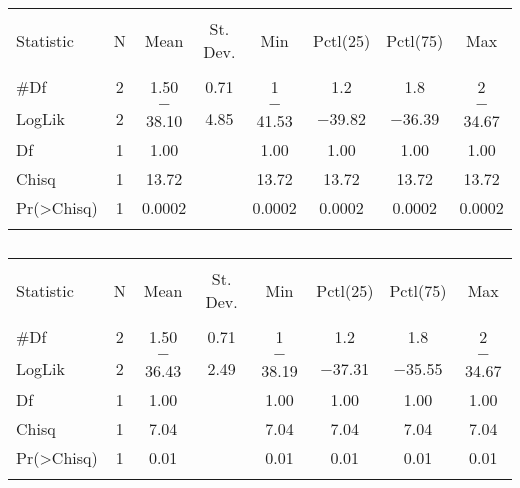 
\begin{table}[!htbp] \centering 
  \caption{} 
  \label{} 
\begin{tabular}{@{\extracolsep{5pt}}lccccccc} 
\\[-1.8ex]\hline 
\hline \\[-1.8ex] 
Statistic & \multicolumn{1}{c}{N} & \multicolumn{1}{c}{Mean} & \multicolumn{1}{c}{St. Dev.} & \multicolumn{1}{c}{Min} & \multicolumn{1}{c}{Pctl(25)} & \multicolumn{1}{c}{Pctl(75)} & \multicolumn{1}{c}{Max} \\ 
\hline \\[-1.8ex] 
\#Df & 2 & 1.50 & 0.71 & 1 & 1.2 & 1.8 & 2 \\ 
LogLik & 2 & $-$38.10 & 4.85 & $-$41.53 & $-$39.82 & $-$36.39 & $-$34.67 \\ 
Df & 1 & 1.00 &  & 1.00 & 1.00 & 1.00 & 1.00 \\ 
Chisq & 1 & 13.72 &  & 13.72 & 13.72 & 13.72 & 13.72 \\ 
Pr(\textgreater Chisq) & 1 & 0.0002 &  & 0.0002 & 0.0002 & 0.0002 & 0.0002 \\ 
\hline \\[-1.8ex] 
\end{tabular} 
\end{table} 

\begin{table}[!htbp] \centering 
  \caption{} 
  \label{} 
\begin{tabular}{@{\extracolsep{5pt}}lccccccc} 
\\[-1.8ex]\hline 
\hline \\[-1.8ex] 
Statistic & \multicolumn{1}{c}{N} & \multicolumn{1}{c}{Mean} & \multicolumn{1}{c}{St. Dev.} & \multicolumn{1}{c}{Min} & \multicolumn{1}{c}{Pctl(25)} & \multicolumn{1}{c}{Pctl(75)} & \multicolumn{1}{c}{Max} \\ 
\hline \\[-1.8ex] 
\#Df & 2 & 1.50 & 0.71 & 1 & 1.2 & 1.8 & 2 \\ 
LogLik & 2 & $-$36.43 & 2.49 & $-$38.19 & $-$37.31 & $-$35.55 & $-$34.67 \\ 
Df & 1 & 1.00 &  & 1.00 & 1.00 & 1.00 & 1.00 \\ 
Chisq & 1 & 7.04 &  & 7.04 & 7.04 & 7.04 & 7.04 \\ 
Pr(\textgreater Chisq) & 1 & 0.01 &  & 0.01 & 0.01 & 0.01 & 0.01 \\ 
\hline \\[-1.8ex] 
\end{tabular} 
\end{table} 
